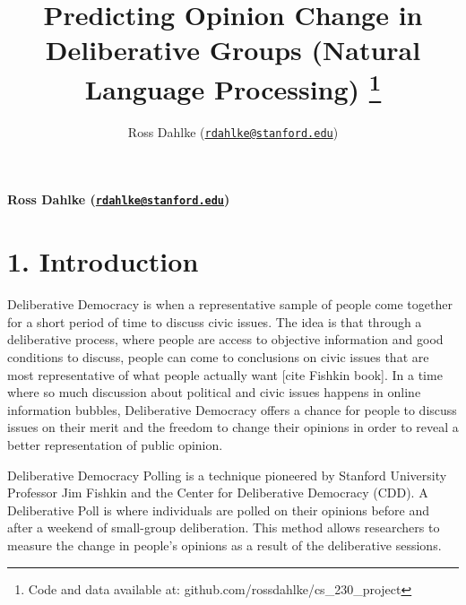 \documentclass[12pt,]{article}
\title{Predicting Opinion Change in Deliberative Groups (Natural Language
Processing) \thanks{Code and data available at: github.com/rossdahlke/cs\_230\_project}  }
\author{\Large Ross Dahlke
(\href{mailto:rdahlke@stanford.edu}{\nolinkurl{rdahlke@stanford.edu}})\vspace{0.05in} \newline\normalsize\emph{}  }
\date{}
\newcommand*{\authorfont}{\fontfamily{phv}\selectfont}
\begin{document}
	
%

{%
\setlength{\parindent}{0pt}
\thispagestyle{plain}
{\fontsize{18}{20}\selectfont\raggedright 
\maketitle  %

}

{
   \vskip 13.5pt\relax \normalsize\fontsize{11}{12} 
\textbf{\authorfont Ross Dahlke
(\href{mailto:rdahlke@stanford.edu}{\nolinkurl{rdahlke@stanford.edu}})} \hskip 15pt \emph{\small }   

}

}






\vskip -8.5pt



\noindent \singlespacing 

\hypertarget{introduction}{%
\section{1. Introduction}\label{introduction}}

Deliberative Democracy is when a representative sample of people come
together for a short period of time to discuss civic issues. The idea is
that through a deliberative process, where people are access to
objective information and good conditions to discuss, people can come to
conclusions on civic issues that are most representative of what people
actually want {[}cite Fishkin book{]}. In a time where so much
discussion about political and civic issues happens in online
information bubbles, Deliberative Democracy offers a chance for people
to discuss issues on their merit and the freedom to change their
opinions in order to reveal a better representation of public opinion.

Deliberative Democracy Polling is a technique pioneered by Stanford
University Professor Jim Fishkin and the Center for Deliberative
Democracy (CDD). A Deliberative Poll is where individuals are polled on
their opinions before and after a weekend of small-group deliberation.
This method allows researchers to measure the change in people's
opinions as a result of the deliberative sessions.
\end{document}
